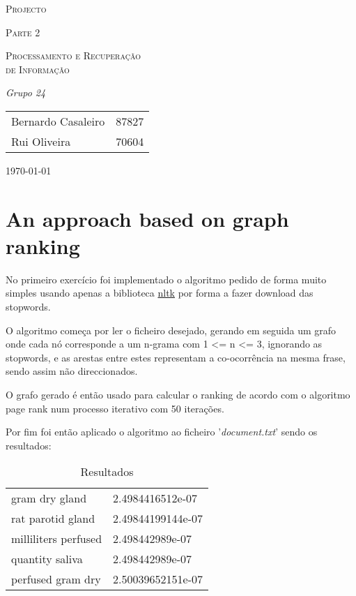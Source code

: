 \documentclass[a4paper,titlepage,11pt]{article}
\begin{document}
\begin{titlepage}
  \begin{center}
    {\scshape \huge Projecto \par}
    \vspace{1cm}

    {\scshape \LARGE Parte 2 \par}
    \vspace{1.5cm}

    {\scshape \Large Processamento e Recuperação \\ de Informação \par}
    \vfill

    {\itshape \Large Grupo 24 \par}
    \vfill

    \begin{tabular}{l l}
      Bernardo Casaleiro & 87827\\
      Rui Oliveira & 70604\\
    \end{tabular}
    \vfill

    {\large \today\par}
  \end{center}
\end{titlepage}

\section{An approach based on graph ranking}
No primeiro exercício foi implementado o algoritmo pedido de forma muito simples usando apenas a
biblioteca \href{http://nltk.org/}{nltk} por forma a fazer download das stopwords.

O algoritmo começa por ler o ficheiro desejado, gerando em seguida um grafo onde cada nó corresponde a
um n-grama com 1 \textless= n \textless= 3, ignorando as stopwords,  e as arestas entre estes representam
a co-ocorrência na mesma frase, sendo assim não direccionados.

O grafo gerado é então usado para calcular o ranking de acordo com o algoritmo page rank num processo
iterativo com 50 iterações.

Por fim foi então aplicado o algoritmo ao ficheiro '\textit{document.txt}' sendo os resultados:

\begin{table}[ht]
  \centering
  \begin{tabular}{ll}
    gram dry gland & 2.4984416512e-07 \\
    rat parotid gland & 2.49844199144e-07 \\
    milliliters perfused & 2.498442989e-07 \\
    quantity saliva & 2.498442989e-07 \\
    perfused gram dry & 2.50039652151e-07
  \end{tabular}
  \caption{Resultados}
\end{table}
\end{document}
